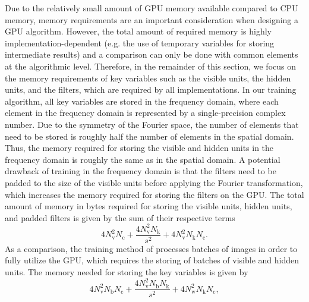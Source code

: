 Due to the relatively small amount of GPU memory available compared to CPU
memory, memory requirements are an important consideration when designing a GPU
algorithm.
However, the total amount of required memory is highly implementation-dependent
(e.g. the use of temporary variables for storing intermediate results) and a
comparison can only be done with common elements at the algorithmic level.
Therefore, in the remainder of this section, we focus on the memory requirements
of key variables such as the visible units, the hidden units, and the filters,
which are required by all implementations. In our training algorithm, all key
variables are stored in the frequency domain, where each element in the
frequency domain is represented by a single-precision complex number. Due to the
symmetry of the Fourier space, the number of elements that need to be stored is
roughly half the number of elements in the spatial domain. Thus, the memory
required for storing the visible and hidden units in the frequency domain is
roughly the same as in the spatial domain. A potential drawback of training in
the frequency domain is that the filters need to be padded to the size of the
visible units before applying the Fourier transformation, which increases the
memory required for storing the filters on the GPU. The total amount of memory
in bytes required for storing the visible units, hidden units, and padded
filters is given by the sum of their respective terms
\begin{equation} 
4N_\text{v}^2N_\text{c} + \frac{4N_\text{v}^2 N_\text{k}}{s^2} +
4N_\text{v}^2N_\text{k}N_\text{c}.
\end{equation}
As a comparison, the training method of \citet{krizhevsky2012} processes
batches of images in order to fully utilize the GPU, which requires the storing of
batches of visible and hidden units. The memory needed for storing the key
variables is given by
\begin{equation} 
4N_\text{v}^2 N_\text{b}N_\text{c} + \frac{4N_\text{v}^2
N_\text{b}N_\text{k}}{s^2} + 4N_\text{w}^2N_\text{k}N_\text{c},
\end{equation}
